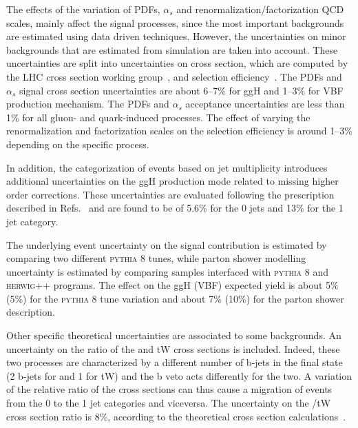 The effects of the variation of PDFs, $\alpha_s$ and renormalization/factorization QCD scales, mainly affect the signal processes, since the most important backgrounds are estimated using data driven techniques. However, the uncertainties on minor backgrounds that are estimated from simulation are taken into account. These uncertainties are split into uncertainties on cross section, which are computed by the LHC cross section working group~\cite{YRtmp}, and selection efficiency~\cite{Butterworth:2015oua}. The PDFs and $\alpha_{s}$ signal cross section  uncertainties are about 6--7\% for ggH and 1--3\% for VBF production mechanism. The PDFs and $\alpha_{s}$ acceptance uncertainties are less than 1\% for all gluon- and quark-induced processes. The effect of varying the renormalization and factorization scales on the selection efficiency is around 1--3\% depending on the specific process. 

In addition, the categorization of events based on jet multiplicity introduces additional uncertainties on the ggH production mode related to missing higher order corrections. These uncertainties are evaluated following the prescription described in Refs.~\cite{Stewart:2011cf,Heinemeyer:2013tqa} and are found to be of 5.6\% for the 0 jets and 13\% for the 1 jet category.

The underlying event uncertainty on the signal contribution is estimated by comparing two different \textsc{pythia 8} tunes, while parton shower modelling uncertainty is estimated by comparing samples interfaced with \textsc{pythia 8} and \textsc{herwig++} programs. 
The effect on the ggH (VBF) expected yield is about 5\% (5\%) for the \textsc{pythia 8} tune variation and about 7\% (10\%) for the parton shower description.

Other specific theoretical uncertainties are associated to some backgrounds. An uncertainty on the ratio of the \ttbar and tW cross sections is included. Indeed, these two processes are characterized by a different number of b-jets in the final state (2 b-jets for \ttbar and 1 for tW) and the b veto acts differently for the two. A variation of the relative ratio of the cross sections can thus cause a migration of events from the 0 to the 1 jet categories and viceversa. The uncertainty on the \ttbar/tW cross section ratio is 8\%, according to the theoretical cross section calculations~\cite{topxsec,singletop}.

